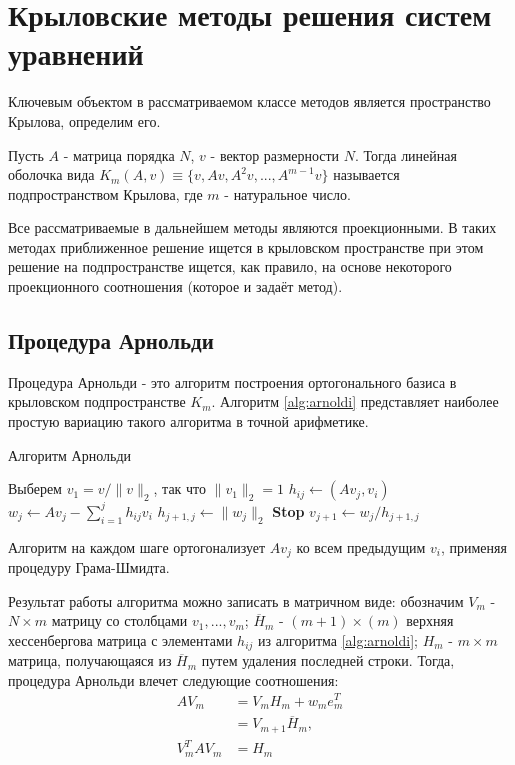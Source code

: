 \section{Крыловские методы решения систем уравнений}
\label{sec:Chapter2} 
Ключевым объектом в рассматриваемом классе методов является пространство Крылова, определим его.
\begin{definition}
    Пусть $A$ - матрица порядка $N$, $v$ - вектор размерности $N$. Тогда линейная
    оболочка вида $K_m\left(A,v\right) \equiv \{v,Av,A^2v,...,A^{m-1}v\} $ называется 
    подпространством Крылова, где $m$ - натуральное число. 
\end{definition}
Все рассматриваемые в дальнейшем методы являются проекционными.
В таких методах приближенное решение ищется в крыловском пространстве при этом 
решение на подпространстве ищется, как правило, на основе некоторого проекционного
 соотношения (которое и задаёт метод).
\subsection[Процедура Арнольди]{Процедура Арнольди \cite{Saad2003}}
Процедура Арнольди - это алгоритм построения ортогонального базиса в крыловском
подпространстве $K_m$. Алгоритм \ref{alg:arnoldi} представляет наиболее простую
вариацию такого алгоритма в точной арифметике.
\begin{algorithm}[H]
    \caption{Алгоритм Арнольди}\label{alg:arnoldi}
    \begin{algorithmic}[1]
    \State Выберем $v_1 = v / \|v\|_2$, так что $\|v_1\|_2 = 1$
    \Statex
            \State $h_{ij} \gets (Av_j, v_i)$
        \EndFor
        \State $w_j \gets Av_j - \sum_{i=1}^j h_{ij}v_i$
        \State $h_{j+1,j} \gets \|w_j\|_2$
            \State \textbf{Stop}
        \EndIf
        \State $v_{j+1} \gets w_j/h_{j+1,j}$
    \EndFor
    \end{algorithmic}
\end{algorithm}
Алгоритм на каждом шаге ортогонализует $Av_j$ ко всем предыдущим $v_i$, 
применяя процедуру Грама-Шмидта. 
\par Результат работы алгоритма можно записать в матричном
виде: обозначим $V_m$ - $N \times m$ матрицу со столбцами $v_1,...,v_m$; 
$\overline{H}_m$ - $\left(m+1\right) \times \left( m \right)$  верхняя хессенбергова матрица с 
элементами $h_{ij}$ из алгоритма \ref{alg:arnoldi}; ${H}_m$ - $ m \times m $ матрица, 
получающаяся из $\overline{H}_m$ путем удаления последней строки. Тогда, процедура Арнольди
влечет следующие соотношения:
\begin{align}
    AV_m &= V_m H_m + w_m e_m^T \\
         &= V_{m+1} \overline{H}_m,\\
    V_m^T A V_m &= H_m \label{eq:VAVHM}
\end{align} 
